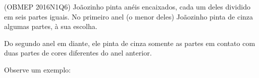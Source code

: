 \documentclass[preview]{standalone}
\begin{document}
\begin{center}
(OBMEP 2016N1Q6) Joãozinho pinta anéis encaixados,
cada um deles dividido em seis partes iguais.
No primeiro anel (o menor deles) Joãozinho pinta de cinza algumas partes, à sua escolha. 

Do segundo anel em diante, ele pinta de cinza 
somente as partes em contato com duas partes de cores diferentes do anel anterior.

Observe um exemplo:
\end{center}
\end{document}
